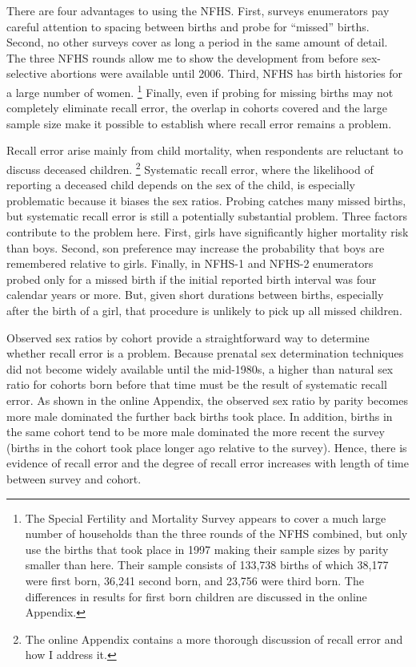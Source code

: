 \documentclass[12pt,letterpaper]{article}
\begin{document}
There are four advantages to using the NFHS.
First, surveys enumerators pay careful attention to spacing between births and
probe for ``missed'' births.
Second, no other surveys cover as long a period in the same amount of detail.
The three NFHS rounds allow me to show the development from before sex-selective 
abortions were available until 2006.
Third, NFHS has birth histories for a large number of women.%
\footnote{
The Special Fertility and Mortality Survey appears to cover a much large number of households
than the three rounds of the NFHS combined, but \citet{jha06} only use the births that 
took place in 1997 making their sample sizes by parity smaller than here.
Their sample consists of 133,738 births of which 38,177 were first
born, 36,241 second born, and 23,756 were third born.
The differences in results for first born children are discussed in the online 
Appendix.
}
Finally, even if probing for missing births may not completely eliminate recall error,   
the overlap in cohorts covered and the large sample size make it possible to establish 
where recall error remains a problem.

Recall error arise mainly from child mortality, when respondents are reluctant to
discuss deceased children.%
\footnote{
The online Appendix contains a more thorough discussion of recall error and how I address it.
} 
Systematic recall error, where the likelihood of reporting a deceased child depends on
the sex of the child, is especially problematic because it biases the sex ratios.
Probing catches many missed births, but systematic recall error is still a potentially 
substantial problem.
Three factors contribute to the problem here.
First, girls have significantly higher mortality risk than boys.
Second, son preference may increase the probability that boys are remembered relative to girls.
Finally, in NFHS-1 and NFHS-2 enumerators probed only for a missed birth if the
initial reported birth interval was four calendar years or more.
But, given short durations between births, especially after the birth of a girl,
that procedure is unlikely to pick up all missed children.

Observed sex ratios by cohort provide a straightforward way to determine 
whether recall error is a problem.
Because prenatal sex determination techniques did not become widely available until the 
mid-1980s, a higher than natural sex ratio for cohorts born before that time must be 
the result of systematic recall error.
As shown in the online Appendix, the observed sex ratio by parity becomes more male dominated the 
further back births took place.
In addition, births in the same cohort tend to be more male dominated the more recent the 
survey (births in the cohort took place longer ago relative to the survey).
Hence, there is evidence of recall error and the degree of recall error increases
with length of time between survey and cohort.
\end{document}
